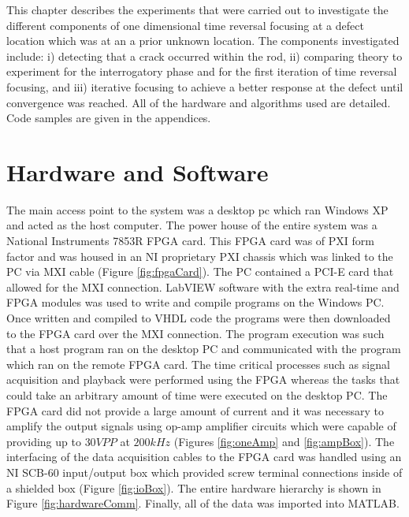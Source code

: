 
This chapter describes the experiments that were carried out to investigate the different components of one dimensional time reversal focusing at a defect location which was at an a prior unknown location. The components investigated include: i) detecting that a crack occurred within the rod, ii) comparing theory to experiment for the interrogatory phase and for the first iteration of time reversal focusing, and iii) iterative focusing to achieve a better response at the defect until convergence was reached. All of the hardware and algorithms used are detailed. Code samples are given in the appendices.

\section{Hardware and Software}
The main access point to the system was a desktop pc which ran Windows XP and acted as the host computer. The power house of the entire system was a National Instruments 7853R FPGA card. This FPGA card was of PXI form factor and was housed in an NI proprietary PXI chassis which was linked to the PC via MXI cable (Figure \ref{fig:fpgaCard}). The PC contained a PCI-E card that allowed for the MXI connection. LabVIEW software with the extra real-time and FPGA modules was used to write and compile programs on the Windows PC. Once written and compiled to VHDL code the programs were then downloaded to the FPGA card over the MXI connection. The program execution was such that a host program ran on the desktop PC and communicated with the program which ran on the remote FPGA card. The time critical processes such as signal acquisition and playback were performed using the FPGA whereas the tasks that could take an arbitrary amount of time were executed on the desktop PC. The FPGA card did not provide a large amount of current and it was necessary to amplify the output signals using op-amp amplifier circuits which were capable of providing up to $30 VPP$ at $200 kHz$ (Figures \ref{fig:oneAmp} and \ref{fig:ampBox}). The interfacing of the data acquisition cables to the FPGA card was handled using an NI SCB-60 input/output box which provided screw terminal connections inside of a shielded box (Figure \ref{fig:ioBox}). The entire hardware hierarchy is shown in Figure \ref{fig:hardwareComm}. Finally, all of the data was imported into MATLAB.

